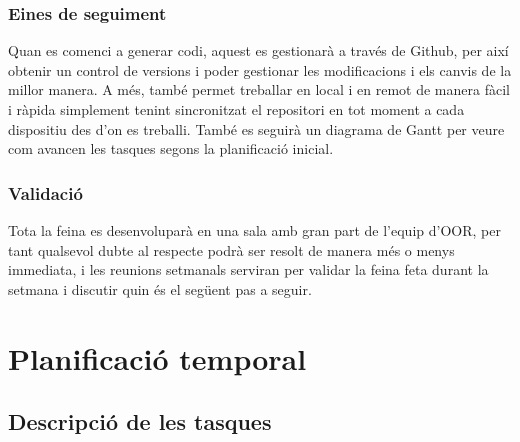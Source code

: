 \documentclass[11pt]{article}
\begin{document}
\subsubsection{Eines de seguiment}
Quan es comenci a generar codi, aquest es gestionarà a través de Github, per així obtenir un control de versions i poder gestionar les modificacions i els canvis de la millor manera. A més, també permet treballar en local i en remot de manera fàcil i ràpida simplement tenint sincronitzat el repositori en tot moment a cada dispositiu des d’on es treballi.
També es seguirà un diagrama de Gantt per veure com avancen les tasques segons la planificació inicial.
\subsubsection{Validació}
Tota la feina es desenvoluparà en una sala amb gran part de l’equip d’OOR, per tant qualsevol dubte al respecte podrà ser resolt de manera més o menys immediata, i les reunions setmanals serviran per validar la feina feta durant la setmana i discutir quin és el següent pas a seguir.


\section{Planificació temporal}
\subsection{Descripció de les tasques}
\end{document}
